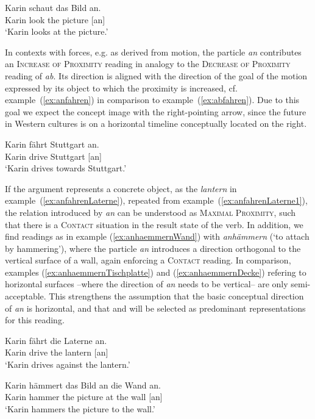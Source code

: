 \documentclass[output=paper]{langsci/langscibook}
\begin{document}
\ea\label{ex:anschauen}
\gll Karin schaut das Bild an.\\
Karin look the picture [an]\\
\glt `Karin looks at the picture.'
\z

In contexts with forces, e.g. as derived from motion, the particle
\textit{an} contributes an \textsc{Increase of Proximity} reading in
analogy to the \textsc{Decrease of Proximity} reading of
\textit{ab}. Its direction is aligned with the direction of the goal
of the motion expressed by its object to which the proximity is
increased, cf. example~(\ref{ex:anfahren}) in comparison to
example~(\ref{ex:abfahren}). Due to this goal we expect the concept image
 with the right-pointing arrow, since the future in
Western cultures is on a horizontal timeline conceptually located on
the right.

\ea\label{ex:anfahren}
\gll Karin fährt Stuttgart an.\\
Karin drive Stuttgart [an]\\
\glt `Karin drives towards Stuttgart.'
\z

If the argument represents a concrete object, as the \textit{lantern}
in example~(\ref{ex:anfahrenLaterne}), repeated from
example~(\ref{ex:anfahrenLaterne1}), the relation introduced by
\textit{an} can be understood as \textsc{Maximal Proximity}, such that
there is a \textsc{Contact} situation in the result state of the
verb. In addition, we find readings as in example
(\ref{ex:anhaemmernWand}) with \textit{anhämmern} (`to attach by
hammering'), where the particle \textit{an} introduces a direction
orthogonal to the vertical surface of a wall, again enforcing a
\textsc{Contact} reading. In comparison, examples
(\ref{ex:anhaemmernTischplatte}) and (\ref{ex:anhaemmernDecke})
refering to horizontal surfaces --where the direction of \textit{an}
needs to be vertical-- are only semi-acceptable. This strengthens the
assumption that the basic conceptual direction of \textit{an} is
horizontal, and that  and  will
be selected as predominant representations for this reading.

\ea\label{ex:anfahrenLaterne}
\gll Karin fährt die Laterne an.\\
Karin drive the lantern [an]\\
\glt `Karin drives against the lantern.'
\z

\ea\label{ex:anhaemmernWand}
\gll Karin hämmert das Bild an die Wand an.\\
Karin hammer the picture at the wall [an]\\
\glt `Karin hammers the picture to the wall.'
\z
\end{document}
